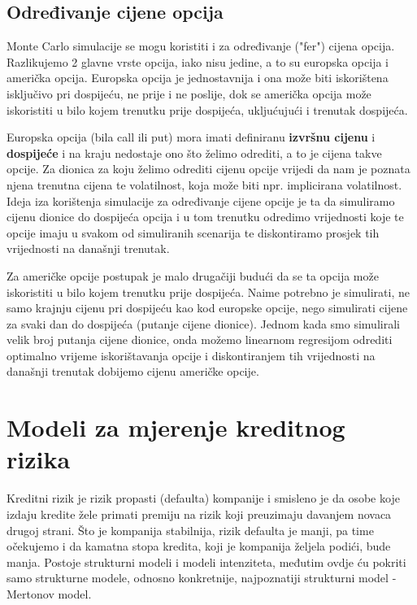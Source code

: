 \documentclass[times, utf8, seminar]{fer}
\begin{document}
\section{Određivanje cijene opcija}
Monte Carlo simulacije se mogu koristiti i za određivanje ("fer") cijena opcija. Razlikujemo 2 glavne vrste opcija, iako nisu jedine, a to su europska opcija i američka opcija. Europska opcija je jednostavnija i ona može biti iskorištena  isključivo pri dospijeću, ne prije i ne poslije, dok se američka opcija može iskoristiti u bilo kojem trenutku prije dospijeća, ukljućujući i trenutak dospijeća.

Europska opcija (bila call ili put) mora imati definiranu \textbf{izvršnu cijenu} i \textbf{dospijeće} i na kraju nedostaje ono što želimo odrediti, a to je cijena takve opcije. Za dionica za koju želimo odrediti cijenu opcije vrijedi da nam je poznata njena trenutna cijena te volatilnost, koja može biti npr. implicirana volatilnost. Ideja iza korištenja simulacije za određivanje cijene opcije je ta da simuliramo cijenu dionice do dospijeća opcija i u tom trenutku odredimo vrijednosti koje te opcije imaju u svakom od simuliranih scenarija te diskontiramo prosjek tih vrijednosti na današnji trenutak.

Za američke opcije postupak je malo drugačiji budući da se ta opcija može iskoristiti u bilo kojem trenutku prije dospijeća. Naime potrebno je simulirati, ne samo krajnju cijenu pri dospijeću kao kod europske opcije, nego simulirati cijene za svaki dan do dospijeća (putanje cijene dionice). Jednom kada smo simulirali velik broj putanja cijene dionice, onda možemo linearnom regresijom odrediti optimalno vrijeme iskorištavanja opcije i diskontiranjem tih vrijednosti na današnji trenutak dobijemo cijenu američke opcije.

\chapter{Modeli za mjerenje kreditnog rizika}
Kreditni rizik je rizik propasti (defaulta) kompanije i smisleno je da osobe koje izdaju kredite žele primati premiju na rizik koji preuzimaju davanjem novaca drugoj strani. Što je kompanija stabilnija, rizik defaulta je manji, pa time očekujemo i da kamatna stopa kredita, koji je kompanija željela podići, bude manja. Postoje strukturni modeli i modeli intenziteta, međutim ovdje ću pokriti samo strukturne modele, odnosno konkretnije, najpoznatiji strukturni model - Mertonov model.
\end{document}
